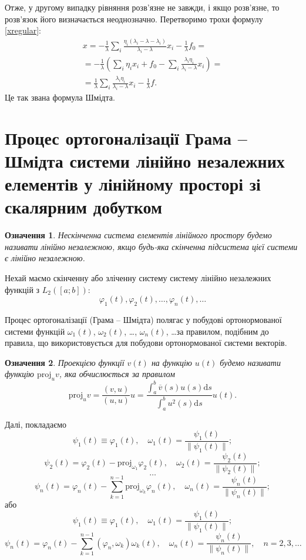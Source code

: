 \documentclass[14pt,twoside]{extreport}
\theoremstyle{mystyle}
\newtheorem{dfn}{Означення}
\numberwithin{equation}{chapter}
\begin{document}
Отже, у другому випадку рівняння розв'язне не завжди, і якщо розв'язне, то розв'язок його визначається неоднозначно. Перетворимо трохи формулу \eqref{xregular}:
\begin{multline}
 x= -\frac{1}{\lambda} \sum_{i} \frac{\eta_i (\lambda_i - \lambda - \lambda_i)}{\lambda_i - \lambda} x_i - \frac{1}{\lambda}f_0=\\
=-\frac{1}{\lambda} \left( \sum_{i} \eta_i x_i + f_0 - \sum_{i} \frac{\lambda_i \eta_i}{\lambda_i - \lambda} x_i\right)=\\
=\frac{1}{\lambda} \sum_{i} \frac{\lambda_i\eta_i}{\lambda_i - \lambda} x_i - \frac{1}{\lambda} f.
\end{multline}
Це так звана формула Шмідта.

\section{Процес ортогоналізації Грама -- Шмідта системи лінійно незалежних елементів  у лінійному просторі зі скалярним добутком}

\begin{dfn}
 Нескінченна система елементів лінійного простору будемо називати лінійно незалежною, якщо будь-яка скінченна підсистема цієї системи  є лінійно незалежною.
\end{dfn}

Нехай маємо скінченну або зліченну систему систему лінійно незалежних функцій з $L_2([a; b])$:
\[
 \varphi_1(t), \varphi_2(t), \ldots, \varphi_n(t), \ldots
\]

Процес ортогоналізації (Грама -- Шмідта) полягає у побудові ортонормованої системи функцій $\omega_1(t)$, $\omega_2(t)$, \ldots, $\omega_n(t)$, \ldots за правилом, подібним до правила, що використовується для побудови ортонормованої системи векторів.

\begin{dfn}
Проекцією функції $v(t)$ на функцію $u(t)$ будемо називати функцію $\mathrm{proj}_u v$, яка обчислюється за правилом
\[
 \mathrm{proj}_u v = \frac{(v, u)}{(u, u)} u = \frac{\int_a^b \overline{v}(s) u(s) \mathrm{d}s}{\int_a^b u^2(s) \mathrm{d}s} u(t).
\]
\end{dfn}

Далі, покладаємо
\[
 \psi_1(t) \equiv \varphi_1(t), \quad \omega_1(t) = \frac{\psi_1(t)}{\|\psi_1(t)\|};
\]
\[
 \psi_2(t) = \varphi_2(t) - \mathrm{proj}_{\omega_1}\varphi_2(t), \quad \omega_2(t) = \frac{\psi_2(t)}{\|\psi_2(t)\|};
\]
\[
 \ldots
\]
\[
 \psi_n(t) = \varphi_n(t) - \sum_{k=1}^{n-1}\mathrm{proj}_{\omega_k}\varphi_n(t), \quad \omega_n(t) = \frac{\psi_n(t)}{\|\psi_n(t)\|};
\]
або
\[
 \psi_1(t) \equiv \varphi_1(t), \quad \omega_1(t) = \frac{\psi_1(t)}{\|\psi_1(t)\|};
\]
\[
 \psi_n(t) = \varphi_n(t) - \sum_{k=1}^{n-1}(\varphi_n, \omega_k)\omega_k(t), \quad \omega_n(t) = \frac{\psi_n(t)}{\|\psi_n(t)\|}, \quad n=2, 3, \ldots
\]
\end{document}
